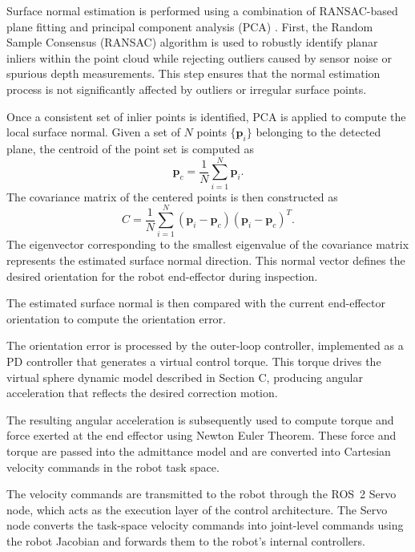 \documentclass[journal]{IEEEtran}
\begin{document}
Surface normal estimation is performed using a combination of   RANSAC-based plane fitting \cite{fischler1981random} and principal component analysis (PCA) \cite{winn2023model}. First, the Random Sample Consensus (RANSAC) algorithm is used to robustly identify planar inliers within the point cloud while rejecting outliers caused by sensor noise or spurious depth measurements. This step ensures that the normal estimation process is not significantly affected by outliers or irregular surface points.

Once a consistent set of inlier points is identified, PCA is applied to compute the local surface normal. Given a set of $N$ points $\{\mathbf{p}_i\}$ belonging to the detected plane, the centroid of the point set is computed as
%
\begin{equation}
\mathbf{p}_c = \frac{1}{N} \sum_{i=1}^{N} \mathbf{p}_i.
\end{equation}
%
The covariance matrix of the centered points is then constructed as
%
\begin{equation}
C = \frac{1}{N} \sum_{i=1}^{N} (\mathbf{p}_i - \mathbf{p}_c)(\mathbf{p}_i - \mathbf{p}_c)^T.
\end{equation}
%
The eigenvector corresponding to the smallest eigenvalue of the covariance matrix represents the estimated surface normal direction. This normal vector defines the desired orientation for the robot end-effector during inspection.

The estimated surface normal is then compared with the current end-effector orientation to compute the orientation error. 

The orientation error is processed by the outer-loop controller, implemented as a PD controller that generates a virtual control torque. This torque drives the virtual sphere dynamic model described in Section C, producing angular acceleration that reflects the desired correction motion.

The resulting angular acceleration is subsequently used to compute torque and force exerted at the end effector using Newton Euler Theorem. These force and torque are passed into the admittance model and are converted into Cartesian velocity commands in the robot task space.

The velocity commands are transmitted to the robot through the ROS~2 Servo node, which acts as the execution layer of the control architecture. The Servo node converts the task-space velocity commands into joint-level commands using the robot Jacobian and forwards them to the robot's internal controllers.
\end{document}
